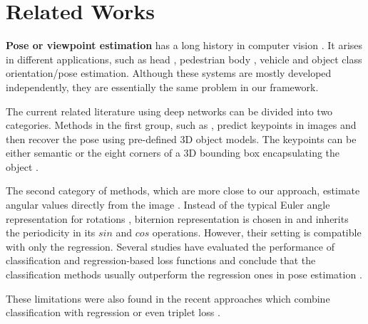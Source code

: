 \section{Related Works}
\noindent\textbf{Pose or viewpoint estimation} has a long history in computer vision \cite{murphy2009head}. It arises in different applications, such as head \cite{murphy2009head}, pedestrian body \cite{raza2018appearance}, vehicle \cite{yang2018hierarchical} and object class \cite{su2015render} orientation/pose estimation. Although these systems are mostly developed independently, they are essentially the same problem in our framework.

The current related literature using deep networks can be divided into two categories. Methods in the first group, such as \cite{rad2017bb8,grabner20183d,zhou2018starmap}, predict keypoints in images and then recover the pose using pre-defined 3D object models. The keypoints can be either semantic \cite{pavlakos20176,wu2016single,massa2016crafting} or the eight corners of a 3D bounding box encapsulating the object \cite{rad2017bb8,grabner20183d}. 

The second category of methods, which are more close to our approach, estimate angular values directly from the image \cite{elhoseiny2016comparative,wang2016viewpoint}. Instead of the typical Euler angle representation for rotations \cite{elhoseiny2016comparative}, biternion representation is chosen in \cite{beyer2015biternion,prokudin2018deep} and inherits the periodicity in its $sin$ and $cos$ operations. However, their setting is compatible with only the regression. Several studies have evaluated the performance of classification and regression-based loss functions and conclude that the classification methods usually outperform the regression ones in pose estimation \cite{massa2016crafting,mahendran2018mixed}. 

These limitations were also found in the recent approaches which combine classification with regression or even triplet loss \cite{mahendran2018mixed,yang2018hierarchical}.



